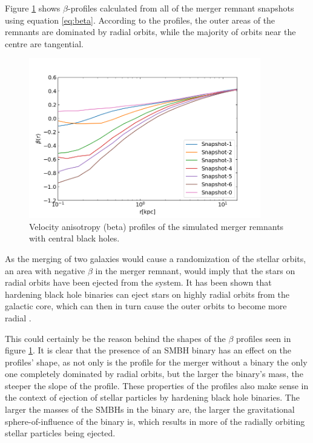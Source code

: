 \documentclass[english, oneside]{HYgradu}
\begin{document}
Figure \ref{figure:beta_no_rb} shows $\beta$-profiles calculated from all of the merger remnant snapshots using equation \ref{eq:beta}. According to the profiles, the outer areas of the remnants are dominated by radial orbits, while the majority of orbits near the centre are tangential.

\begin{figure}[h]
	\centering
	\includegraphics[width=0.9\textwidth]{beta_no_rb.png}
	\caption{Velocity anisotropy (beta) profiles of the simulated merger remnants with central black holes.}
	\label{figure:beta_no_rb}
\end{figure}


As the merging of two galaxies would cause a randomization of the stellar orbits, an area with negative $\beta$ in the merger remnant, would imply that the stars on radial orbits have been ejected from the system. It has been shown that hardening black hole binaries can eject stars on highly radial orbits from the galactic core, which can then in turn cause the outer orbits to become more radial \citep{Quinlan1997, Milosavljevic2001, Thomas2014}.

This could certainly be the reason behind the shapes of the $\beta$ profiles seen in figure \ref{figure:beta_no_rb}. It is clear that the presence of an SMBH binary has an effect on the profiles' shape, as not only is the profile for the merger without a binary the only one completely dominated by radial orbits, but the larger the binary's mass, the steeper the slope of the profile. These properties of the profiles also make sense in the context of ejection of stellar particles by hardening black hole binaries. The larger the masses of the SMBHs in the binary are, the larger the gravitational sphere-of-influence of the binary is, which results in more of the radially orbiting stellar particles being ejected.
\end{document}
